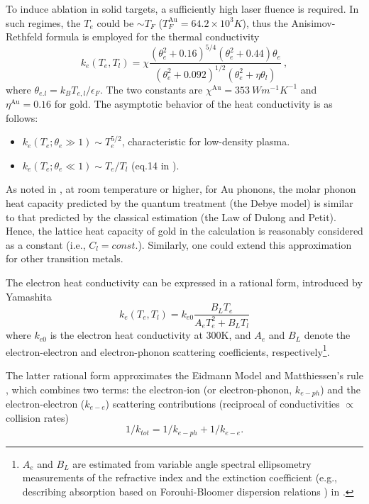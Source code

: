 To induce ablation in solid targets, a sufficiently high laser fluence is required. In such regimes, the $T_e$ could be $\sim T_F$ ($T_F^{\text{Au}} = 64.2 \times 10^3 K$), thus the Anisimov-Rethfeld formula is employed for the thermal conductivity\cite{Anisimov_1997}
\begin{equation}
  k_e(T_e, T_l) = \chi \frac{(\theta_e^2 + 0.16)^{5/4} (\theta_e^2 + 0.44) \theta_e}{(\theta_e^2 + 0.092)^{1/2}(\theta_e^2 + \eta \theta_l)} \ ,
\end{equation}
where $\theta_{e.l} = k_B T_{e,l}/ \epsilon_F$. The two constants are $\chi^{\text{Au}} = 353 \ Wm^{-1}K^{-1}$ and $\eta^{\text{Au}} = 0.16$ for gold. The asymptotic behavior of the heat conductivity is as follows:
\begin{itemize}
  \item $k_e(T_e ; \theta_e \gg 1) \sim T_e^{5/2}$, characteristic for low-density plasma.
  \item $k_e(T_e; \theta_e \ll 1) \sim T_e/ T_l$ (eq.14 in \cite{Chen_2001}).
\end{itemize}

As noted in  \cite{Jiang_2007}, at room temperature or higher, for Au phonons, the molar phonon heat capacity predicted by the quantum treatment (the Debye model) is similar to that predicted by the classical estimation (the Law of Dulong and Petit). Hence, the lattice heat capacity of gold in the calculation is reasonably considered as a constant (i.e., $C_l = const.$). Similarly, one could extend this approximation for other transition metals.

The electron heat conductivity can be expressed in a rational form, introduced by Yamashita \cite{Yamashita_2006}
\begin{equation}
  k_e(T_e,T_l) = k_{e0}\frac{B_L T_e}{A_e T_e^2 + B_L T_l}
  \label{eq:ch1-heat_conductivity_approx}
\end{equation}
where $k_{e0}$ is the electron heat conductivity at 300K, and $A_e$ and $B_L$ denote the electron-electron and electron-phonon scattering coefficients, respectively\footnote{$A_e$ and $B_L$ are estimated from variable angle spectral ellipsometry measurements of the refractive index and the extinction coefficient (e.g., describing absorption based on Forouhi-Bloomer dispersion relations \cite{Forouhi_1986}) in \cite{Fraggelakis_2021}.}.

The latter rational form approximates the Eidmann Model \cite{Eidmann_2000} and Matthiessen's rule \cite{Matthiessen_1864},
which combines two terms: the electron-ion (or electron-phonon, $k_{e-ph}$)
and the electron-electron ($k_{e-e}$) scattering contributions (reciprocal of conductivities $\propto$ collision rates)
\begin{equation}
  1/k_{tot} = 1/k_{e-ph} + 1/k_{e-e}.
  \label{eq:ch1-heat_conductivity_Matthiessen}
\end{equation}

